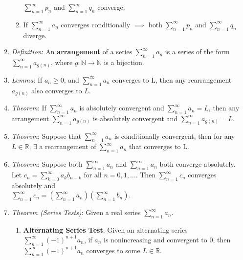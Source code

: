 \documentclass[10pt]{article}
\newcommand{\infsrsn}[1]{\sum\limits^\infty_{n=1}#1}
\newcommand{\real}{\mathbb{R}}
\newcommand{\nat}{\mathbb{N}}
\begin{document}
\begin{multicols*}{3}
\begin{enumerate}
\begin{enumerate}
			            $\infsrsn{p_n}$ and $\infsrsn{q_n}$ converge.
			      \item If $\infsrsn{a_n}$ converges conditionally $\implies$
			            both $\infsrsn{p_n}$ and $\infsrsn{q_n}$ diverge.
		      \end{enumerate}
		\item \emph{Definition}: An \textbf{arrangement} of a series
		      $\infsrsn{a_n}$ is a series of the form $\infsrsn{a_{g(n)}}$, where
		      $g:\nat\to\nat$ is a bijection.
		\item \emph{Lemma}: If $a_{n}\geq0$, and $\infsrsn{a_{n}}$ converges to L,
			then any rearrangement $a_{g(n)}$ also converges to $L$.
		\item \emph{Theorem}: If $\infsrsn{a_{n}}$ is absolutely convergent and
			$\infsrsn{a_{n}}=L$, then any arrangement $\infsrsn{a_{g(n)}}$ is
			absolutely convergent and $\infsrsn{a_{g(n)}}=L$.
		\item \emph{Theorem}: Suppose that $\infsrsn{a_{n}}$ is conditionally
			convergent, then for any $L\in\real$, $\exists$ a rearrangement of
			$\infsrsn{a_{n}}$ that converges to L.
		\item \emph{Theorem}: Suppose both $\infsrsn{a_{n}}$ and $\infsrsn{a_{n}}$
			both converge absolutely. Let
			$c_{n}=\sum\limits^{\infty}_{k=0}a_{k}b_{n-k}$ for all $n=0,1,\dots$. Then
			$\infsrsn{c_{n}}$ converges absolutely and\\
			$\infsrsn{c_{n}}=(\infsrsn{a_{n}})(\infsrsn{b_{n}})$.
		\item \emph{Theorem (Series Tests)}: Given a real series $\infsrsn{a_{n}}$.
			\begin{enumerate}
		\item \textbf{Alternating Series Test}: Given an alternating series
		      $\infsrsn{(-1)^{n+1}a_n}$, if $a_n$ is nonincreasing and convergent to
		      0, then $\infsrsn{(-1)^{n+1}a_n}$ converges to some $L\in\real$.


\end{enumerate}
\end{enumerate}
\end{multicols*}
\end{document}
